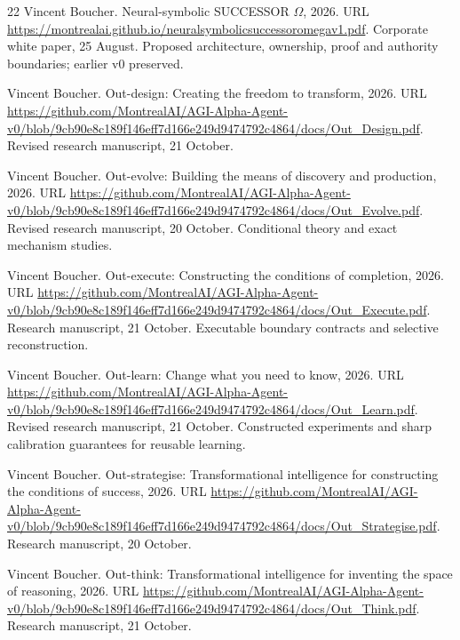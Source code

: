 \documentclass[11pt]{article}
\begin{document}
\begin{thebibliography}{22}
Vincent Boucher.
\newblock Neural-symbolic {SUCCESSOR} {$\Omega$}, 2026{}.
\newblock URL
  \url{https://montrealai.github.io/neuralsymbolicsuccessoromegav1.pdf}.
\newblock Corporate white paper, 25 August. Proposed architecture, ownership,
  proof and authority boundaries; earlier v0 preserved.

Vincent Boucher.
\newblock Out-design: Creating the freedom to transform, 2026{}.
\newblock URL
  \url{https://github.com/MontrealAI/AGI-Alpha-Agent-v0/blob/9cb90e8c189f146eff7d166e249d9474792c4864/docs/Out_Design.pdf}.
\newblock Revised research manuscript, 21 October.

Vincent Boucher.
\newblock Out-evolve: Building the means of discovery and production,
  2026{}.
\newblock URL
  \url{https://github.com/MontrealAI/AGI-Alpha-Agent-v0/blob/9cb90e8c189f146eff7d166e249d9474792c4864/docs/Out_Evolve.pdf}.
\newblock Revised research manuscript, 20 October. Conditional theory and exact
  mechanism studies.

Vincent Boucher.
\newblock Out-execute: Constructing the conditions of completion,
  2026{}.
\newblock URL
  \url{https://github.com/MontrealAI/AGI-Alpha-Agent-v0/blob/9cb90e8c189f146eff7d166e249d9474792c4864/docs/Out_Execute.pdf}.
\newblock Research manuscript, 21 October. Executable boundary contracts and
  selective reconstruction.

Vincent Boucher.
\newblock Out-learn: Change what you need to know, 2026{}.
\newblock URL
  \url{https://github.com/MontrealAI/AGI-Alpha-Agent-v0/blob/9cb90e8c189f146eff7d166e249d9474792c4864/docs/Out_Learn.pdf}.
\newblock Revised research manuscript, 21 October. Constructed experiments and
  sharp calibration guarantees for reusable learning.

Vincent Boucher.
\newblock Out-strategise: Transformational intelligence for constructing the
  conditions of success, 2026{}.
\newblock URL
  \url{https://github.com/MontrealAI/AGI-Alpha-Agent-v0/blob/9cb90e8c189f146eff7d166e249d9474792c4864/docs/Out_Strategise.pdf}.
\newblock Research manuscript, 20 October.

Vincent Boucher.
\newblock Out-think: Transformational intelligence for inventing the space of
  reasoning, 2026{}.
\newblock URL
  \url{https://github.com/MontrealAI/AGI-Alpha-Agent-v0/blob/9cb90e8c189f146eff7d166e249d9474792c4864/docs/Out_Think.pdf}.
\newblock Research manuscript, 21 October.


\end{thebibliography}
\end{document}
